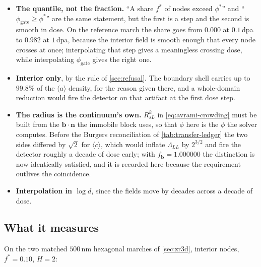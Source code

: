 \documentclass{article}
\newcommand{\aloop}{\ensuremath{\langle a\rangle}}
\newcommand{\cloop}{\ensuremath{\langle c\rangle}}
\newcommand{\bvec}{\bm b}
\newcommand{\nvec}{\bm n}
\begin{document}
\begin{itemize}
\item \textbf{The quantile, not the fraction.} ``A share $f^\ast$ of nodes exceed
      $\phi^\ast$'' and ``$\phi_{\mathrm{gate}}\ge\phi^\ast$'' are the same
      statement, but the first is a step and the second is smooth in dose. On the
      reference march the share goes from $0.000$ at $0.1\,$dpa to $0.982$ at
      $1\,$dpa, because the interior field is smooth enough that every node
      crosses at once; interpolating that step gives a meaningless crossing dose,
      while interpolating $\phi_{\mathrm{gate}}$ gives the right one.
\item \textbf{Interior only}, by the rule of \cref{sec:refusal}. The boundary
      shell carries up to $99.8\%$ of the \aloop{} density, for the reason given
      there, and a whole-domain reduction would fire the detector on that
      artifact at the first dose step.
\item \textbf{The radius is the continuum's own.} $R^k_{sL}$ in
      \cref{eq:avrami-crowding} must be built from the $\bvec\!\cdot\!\nvec$ the
      immobile block uses, so that $\phi$ here is the $\phi$ the solver computes.
      Before the Burgers reconciliation of \cref{tab:transfer-ledger} the two
      sides differed by $\sqrt2$ for \cloop{}, which would inflate $\Lambda_{LL}$
      by $2^{3/2}$ and fire the detector roughly a decade of dose early; with
      $f_{\bvec}=1.000000$ the distinction is now identically satisfied, and it
      is recorded here because the requirement outlives the coincidence.
\item \textbf{Interpolation in $\log d$}, since the fields move by decades across
      a decade of dose.
\end{itemize}

\subsection{What it measures}
\label{sec:dcoarsen-measured}

On the two matched $500\,$nm hexagonal marches of \cref{sec:zr3d}, interior
nodes, $f^\ast=0.10$, $H=2$:
\end{document}
